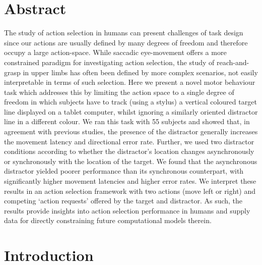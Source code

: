\documentclass[10pt,letterpaper]{article}
\begin{document}
\section*{Abstract}
The study of action selection in humans can present challenges of task
design since our actions are usually defined by many degrees of
freedom and therefore occupy a large action-space. While saccadic
eye-movement offers a more constrained paradigm for investigating
action selection, the study of reach-and-grasp in upper limbs has
often been defined by more complex scenarios, not easily interpretable
in terms of such selection.  Here we present a novel motor behaviour
task which addresses this by limiting the action space to a single
degree of freedom in which subjects have to track (using a stylus) a
vertical coloured target line displayed on a tablet computer, whilst
ignoring a similarly oriented distractor line in a different
colour. We ran this task with 55 subjects and showed that, in
agreement with previous studies, the presence of the distractor
generally increases the movement latency and directional error
rate. Further, we used two distractor conditions according to whether
the distractor's location changes asynchronously or synchronously with
the location of the target. We found that the asynchronous distractor
yielded poorer performance than its synchronous counterpart, with
significantly higher movement latencies and higher error rates. We
interpret these results in an action selection framework with two
actions (move left or right) and competing `action requests' offered
by the target and distractor. As such, the results provide insights
into action selection performance in humans and supply data for
directly constraining future computational models therein.

\linenumbers

\section*{Introduction}
\end{document}
